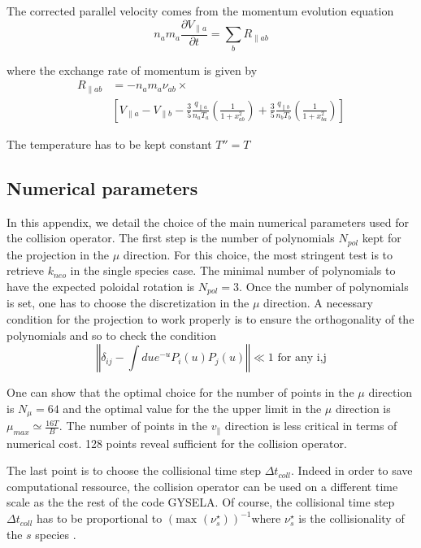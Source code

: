 \documentclass[11pt,preprint]{elsarticle}
\begin{document}
The corrected parallel velocity comes from the momentum evolution
equation
\[
n_{a}m_{a}\frac{\partial V_{\parallel a}}{\partial t}=\sum_{b}R_{\parallel ab}
\]


where the exchange rate of momentum is given by 
\begin{eqnarray*}
R_{\parallel ab} &= - n_{a} m_{a} \nu_{ab} \times \\
&\left[V_{\parallel a} - V_{\parallel b} - \frac{3}{5}\frac{q_{\parallel a}}{n_{a} T_{a}}\left(\frac{1}{1+x_{ab}^{2}}\right) + \frac{3}{5}\frac{q_{\parallel b}}{n_{b} T_{b}}\left(\frac{1}{1+x_{ba}^{2}}\right)\right]
\end{eqnarray*}

The temperature has to be kept constant $T''=T$ 

\subsection{Numerical parameters}

In this appendix, we detail the choice of the main numerical parameters
used for the collision operator. The first step is the number of polynomials
$N_{pol}$ kept for the projection in the $\mu$ direction. For this
choice, the most stringent test is to retrieve $k_{neo}$ in the single
species case. The minimal number of polynomials to have the expected
poloidal rotation is $N_{pol}=3$. Once the number of polynomials
is set, one has to choose the discretization in the $\mu$ direction.
A necessary condition for the projection to work properly is to ensure
the orthogonality of the polynomials and so to check the condition
\[
\left\Vert \delta_{ij}-\int due^{-u}P_{i}(u)P_{j}(u)\right\Vert \ll1\text{ for any i,j}
\]


One can show that the optimal choice for the number of points in the
$\mu$ direction is $N_{\mu}=64$ and the optimal value for the the
upper limit in the $\mu$ direction is $\mu_{max}\simeq\frac{16T}{B}$.
The number of points in the $v_{\parallel}$ direction is less critical
in terms of numerical cost. 128 points reveal sufficient for the collision
operator.

The last point is to choose the collisional time step $\Delta t_{coll}$.
Indeed in order to save computational ressource, the collision operator
can be used on a different time scale as the the rest of the code
GYSELA. Of course, the collisional time step $\Delta t_{coll}$ has
to be proportional to $\left(\text{max }\left(\nu_{s}^{\star}\right)\right)^{-1}$where
$\nu_{s}^{\star}$ is the collisionality of the $s$ species .
\end{document}
